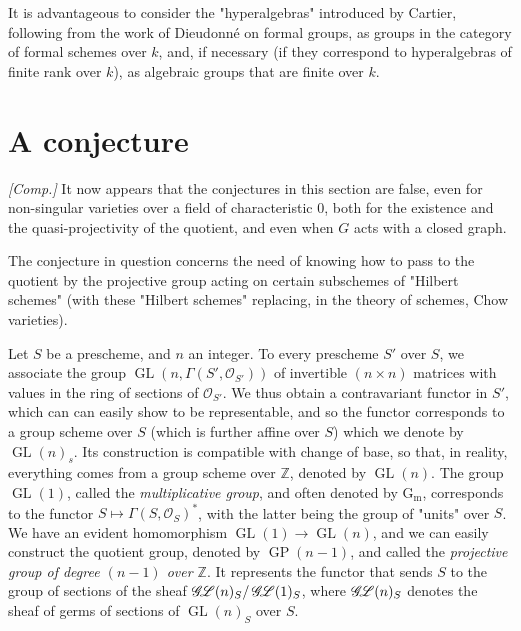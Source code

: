   It is advantageous to consider the "hyperalgebras" introduced by Cartier, following from the work of Dieudonné on formal groups, as groups in the category of formal schemes over \(k\), and, if necessary (if they correspond to hyperalgebras of finite rank over \(k\)), as algebraic groups that are finite over \(k\).\chapter{A conjecture}\thispagestyle{fancy}\label{fga3.iii-8}\begin{remark}{}\label{fga3.iii-8-remark-i}\skipsinglepar\par{}\emph{[Comp.]}
    It now appears that the conjectures in this section are false, even for non-singular varieties over a field of characteristic \(0\), both for the existence and the quasi-projectivity of the quotient, and even when \(G\) acts with a closed graph.\end{remark}\par{}The conjecture in question concerns the need of knowing how to pass to the quotient by the projective group acting on certain subschemes of "Hilbert schemes" (with these "Hilbert schemes" replacing, in the theory of schemes, Chow varieties).\par{}Let \(S\) be a prescheme, and \(n\) an integer.
  To every prescheme \(S'\) over \(S\), we associate the group \(\operatorname {GL}(n,\Gamma (S',\mathcal {O}_{S'}))\) of invertible \((n\times  n)\) matrices with values in the ring of sections of \(\mathcal {O}_{S'}\).
  We thus obtain a contravariant functor in \(S'\), which can can easily show to be representable, and so the functor corresponds to a group scheme over \(S\) (which is further affine over \(S\)) which we denote by \(\operatorname {GL}(n)_s\).
  Its construction is compatible with change of base, so that, in reality, everything comes from a group scheme over \(\mathbb {Z}\), denoted by \(\operatorname {GL}(n)\).
  The group \(\operatorname {GL}(1)\), called the \emph{multiplicative group}, and often denoted by \(\operatorname {G_m}\), corresponds to the functor \(S\mapsto \Gamma (S,\mathcal {O}_S)^*\), with the latter being the group of "units" over \(S\).
  We have an evident homomorphism \(\operatorname {GL}(1)\to \operatorname {GL}(n)\), and we can easily construct the quotient group, denoted by \(\operatorname {GP}(n-1)\), and called the \emph{projective group of degree \((n-1)\) over \(\mathbb {Z}\)}.
  It represents the functor that sends \(S\) to the group of sections of the sheaf \(\operatorname {\mathscr {G}\kern  -2pt\mathscr {L}}(n)_S/\operatorname {\mathscr {G}\kern  -2pt\mathscr {L}}(1)_S\), where \(\operatorname {\mathscr {G}\kern  -2pt\mathscr {L}}(n)_S\) denotes the sheaf of germs of sections of \(\operatorname {GL}(n)_S\) over \(S\).
